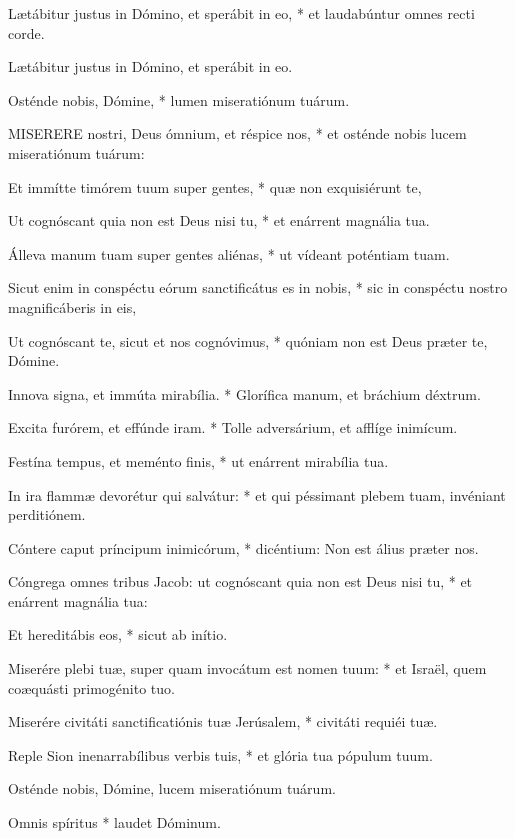 Lætábitur justus in Dómino, et sperábit in eo, * et laudabúntur omnes recti corde.

 Lætábitur justus in Dómino, et sperábit in eo.

 Osténde nobis, Dómine, * lumen miseratiónum tuárum.


\lettrine[lines=2]{M}{ISERERE} nostri, Deus ómnium, et réspice nos, * et osténde nobis lucem miseratiónum tuárum:

Et immítte timórem tuum super gentes, * quæ non exquisiérunt te,

Ut cognóscant quia non est Deus nisi tu, * et enárrent magnália tua.

Álleva manum tuam super gentes aliénas, * ut vídeant poténtiam tuam.

Sicut enim in conspéctu eórum sanctificátus es in nobis, * sic in conspéctu nostro magnificáberis in eis,

Ut cognóscant te, sicut et nos cognóvimus, * quóniam non est Deus præter te, Dómine.

Innova signa, et immúta mirabília. * Glorífica manum, et bráchium déxtrum.

Excita furórem, et effúnde iram. * Tolle adversárium, et afflíge inimícum.

Festína tempus, et meménto finis, * ut enárrent mirabília tua.

In ira flammæ devorétur qui salvátur: * et qui péssimant plebem tuam, invéniant perditiónem.

Cóntere caput príncipum inimicórum, * dicéntium: Non est álius præter nos.

Cóngrega omnes tribus Jacob: ut cognóscant quia non est Deus nisi tu, * et enárrent magnália tua:

Et hereditábis eos, * sicut ab inítio.

Miserére plebi tuæ, super quam invocátum est nomen tuum: * et Israël, quem coæquásti primogénito tuo.

Miserére civitáti sanctificatiónis tuæ Jerúsalem, * civitáti requiéi tuæ.

Reple Sion inenarrabílibus verbis tuis, * et glória tua pópulum tuum.

 Osténde nobis, Dómine, lucem miseratiónum tuárum.

 Omnis spíritus * laudet Dóminum.


